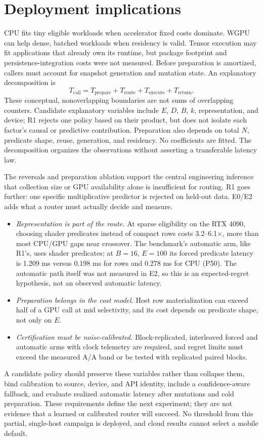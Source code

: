 \documentclass[10pt]{article}
\begin{document}
\section{Deployment implications}
CPU fits tiny eligible workloads when accelerator fixed costs dominate. WGPU can help dense, batched workloads when residency is valid. Tensor execution may fit applications that already own its runtime, but package footprint and persistence-integration costs were not measured. Before preparation is amortized, callers must account for snapshot generation and mutation state.
An explanatory decomposition is
\begin{equation}
T_{\mathrm{call}}=T_{\mathrm{prepare}}+T_{\mathrm{route}}+T_{\mathrm{execute}}+T_{\mathrm{return}}.
\end{equation}
These conceptual, nonoverlapping boundaries are not sums of overlapping counters. Candidate explanatory variables include $E$, $D$, $B$, $k$, representation, and device; R1 rejects one policy based on their product, but does not isolate each factor's causal or predictive contribution. Preparation also depends on total $N$, predicate shape, reuse, generation, and residency. No coefficients are fitted. The decomposition organizes the observations without asserting a transferable latency law.

The reversals and preparation ablation support the central engineering inference that collection size or GPU availability alone is insufficient for routing. R1 goes further: one specific multiplicative predictor is rejected on held-out data. E0/E2 adds what a router must actually decide and measure.
\begin{itemize}
\item \emph{Representation is part of the route.} At sparse eligibility on the RTX 4090, choosing shader predicates instead of compact rows costs 3.2--6.1$\times$, more than most CPU/GPU gaps near crossover. The benchmark's automatic arm, like R1's, uses shader predicates; at $B=16$, $E=100$ its forced predicate latency is 1.209 ms versus 0.198 ms for rows and 0.278 ms for CPU (P50). The automatic path itself was not measured in E2, so this is an expected-regret hypothesis, not an observed automatic latency.
\item \emph{Preparation belongs in the cost model.} Host row materialization can exceed half of a GPU call at mid selectivity, and its cost depends on predicate shape, not only on $E$.
\item \emph{Certification must be noise-calibrated.} Block-replicated, interleaved forced and automatic arms with clock telemetry are required, and regret limits must exceed the measured A/A band or be tested with replicated paired blocks.
\end{itemize}
A candidate policy should preserve these variables rather than collapse them, bind calibration to source, device, and API identity, include a confidence-aware fallback, and evaluate realized automatic latency after mutations and cold preparation. These requirements define the next experiment; they are not evidence that a learned or calibrated router will succeed. No threshold from this partial, single-host campaign is deployed, and cloud results cannot select a mobile default.
\end{document}

